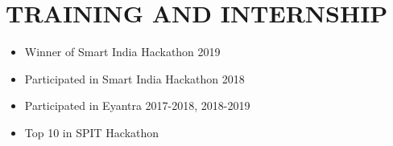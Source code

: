 \documentclass[paper=a4,fontsize=12pt]{scrartcl}
\newcommand{\NewPart}[1]{\section*{\uppercase{#1}}}
\begin{document}
\NewPart{Training and Internship}{}
\begin{itemize}
	\item Winner of Smart India Hackathon 2019
	\item Participated in Smart India Hackathon 2018
	\item Participated in Eyantra 2017-2018, 2018-2019
	\item Top 10 in SPIT Hackathon	
\end{itemize}
\end{document}
